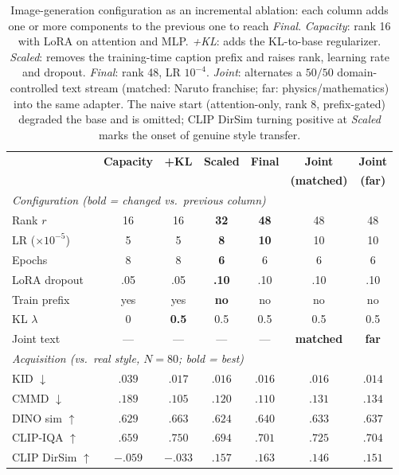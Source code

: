 \documentclass{article}
\begin{document}
\begin{table}[t]
\centering\small
\setlength{\tabcolsep}{5pt}
\renewcommand{\arraystretch}{1.05}
\begin{tabular}{lcccccc}
\toprule
 & \textbf{Capacity} & \textbf{+KL} & \textbf{Scaled} & \textbf{Final} & \textbf{Joint} & \textbf{Joint} \\
 & & & & & \textbf{(matched)} & \textbf{(far)} \\
\midrule
\multicolumn{7}{l}{\textit{Configuration (bold = changed vs.\ previous column)}}\\
Rank $r$              & 16 & 16 & \textbf{32} & \textbf{48} & 48 & 48 \\
LR ($\times10^{-5}$)  & 5 & 5 & \textbf{8} & \textbf{10} & 10 & 10 \\
Epochs               & 8 & 8 & \textbf{6} & 6 & 6 & 6 \\
LoRA dropout         & .05 & .05 & \textbf{.10} & .10 & .10 & .10 \\
Train prefix         & yes & yes & \textbf{no} & no & no & no \\
KL $\lambda$         & 0 & \textbf{0.5} & 0.5 & 0.5 & 0.5 & 0.5 \\
Joint text           & --- & --- & --- & --- & \textbf{matched} & \textbf{far} \\
\midrule
\multicolumn{7}{l}{\textit{Acquisition (vs.\ real style, $N{=}80$; bold = best)}}\\
KID $\downarrow$       & $.039$ & $.017$ & $.016$ & $.016$ & $.016$ & $\mathbf{.014}$ \\
CMMD $\downarrow$      & $.189$ & $\mathbf{.105}$ & $.120$ & $.110$ & $.131$ & $.134$ \\
DINO sim $\uparrow$    & $.629$ & $\mathbf{.663}$ & $.624$ & $.640$ & $.633$ & $.637$ \\
CLIP-IQA $\uparrow$    & $.659$ & $\mathbf{.750}$ & $.694$ & $.701$ & $.725$ & $.704$ \\
CLIP DirSim $\uparrow$ & $-.059$ & $-.033$ & $.157$ & $\mathbf{.163}$ & $.146$ & $.151$ \\
\bottomrule
\end{tabular}
\caption{Image-generation configuration as an incremental ablation: each column
adds one or more components to the previous one to reach \textit{Final}.
\textit{Capacity}: rank 16 with LoRA on attention and MLP. \textit{+KL}: adds the
KL-to-base regularizer. \textit{Scaled}: removes the training-time caption prefix
and raises rank, learning rate and dropout. \textit{Final}: rank 48, LR
$10^{-4}$. \textit{Joint}: alternates a $50/50$ domain-controlled text stream
(matched: Naruto franchise; far: physics/mathematics) into the same adapter. The
naive start (attention-only, rank 8, prefix-gated) degraded the base and is
omitted; CLIP DirSim turning positive at \textit{Scaled} marks the onset of
genuine style transfer.}
\label{tab:panel}
\end{table}
\end{document}
